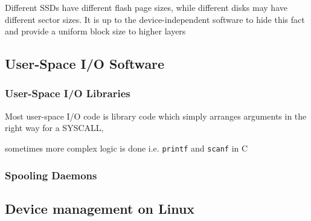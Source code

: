 Different SSDs have different flash page sizes, while different disks
may have different sector sizes. It is up to the device-independent
software to hide this fact and provide a uniform block size to higher
layers

\subsection*{User-Space I/O Software}

\subsubsection*{User-Space I/O Libraries}

Most user-space I/O code is library code which simply arranges arguments
in the right way for a SYSCALL,

\begin{itemize}

    \vItem
          sometimes more complex logic is done i.e. \texttt{printf} and
          \texttt{scanf} in C
\end{itemize}

\subsubsection*{Spooling Daemons}


\subsection*{Device management on Linux}

\hSep